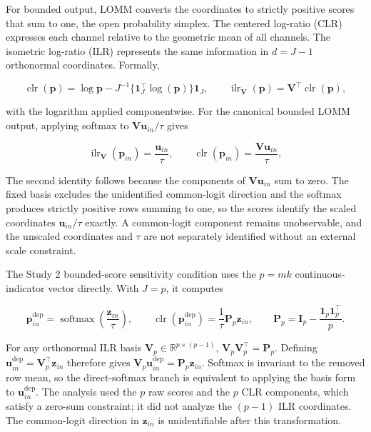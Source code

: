 \documentclass[
]{article}
\begin{document}
For bounded output, LOMM converts the coordinates to strictly positive
scores that sum to one, the open probability simplex. The centered
log-ratio (CLR) expresses each channel relative to the geometric mean of
all channels. The isometric log-ratio (ILR) represents the same
information in \(d=J-1\) orthonormal coordinates. Formally,

\[
\operatorname{clr}(\mathbf p)
=\log\mathbf p-
J^{-1}\{\mathbf 1_J^\top\log(\mathbf p)\}\mathbf 1_J,
\qquad
\operatorname{ilr}_{\mathbf V}(\mathbf p)
=\mathbf V^\top\operatorname{clr}(\mathbf p),
\]

with the logarithm applied componentwise. For the canonical bounded LOMM
output, applying softmax to \(\mathbf V\mathbf u_{in}/\tau\) gives

\[
\operatorname{ilr}_{\mathbf V}(\mathbf p_{in})=\frac{\mathbf u_{in}}{\tau},
\qquad
\operatorname{clr}(\mathbf p_{in})
=\frac{\mathbf V\mathbf u_{in}}{\tau},
\]

The second identity follows because the components of
\(\mathbf V\mathbf u_{in}\) sum to zero. The fixed basis excludes the
unidentified common-logit direction and the softmax produces strictly
positive rows summing to one, so the scores identify the scaled
coordinates \(\mathbf u_{in}/\tau\) exactly. A common-logit component
remains unobservable, and the unscaled coordinates and \(\tau\) are not
separately identified without an external scale constraint.

The Study 2 bounded-score sensitivity condition uses the \(p=mk\)
continuous-indicator vector directly. With \(J=p\), it computes

\[
\mathbf p^{\mathrm{dep}}_{in}
=\operatorname{softmax}\left(\frac{\mathbf z_{in}}{\tau}\right),
\qquad
\operatorname{clr}\!\left(\mathbf p^{\mathrm{dep}}_{in}\right)
=\frac{1}{\tau}\mathbf P_p\mathbf z_{in},
\qquad
\mathbf P_p
=\mathbf I_p-\frac{\mathbf 1_p\mathbf 1_p^\top}{p}.
\]

For any orthonormal ILR basis
\(\mathbf V_p\in\mathbb R^{p\times(p-1)}\),
\(\mathbf V_p\mathbf V_p^\top=\mathbf P_p\). Defining
\(\mathbf u^{\mathrm{dep}}_{in}=\mathbf V_p^\top\mathbf z_{in}\)
therefore gives
\(\mathbf V_p\mathbf u^{\mathrm{dep}}_{in}=\mathbf P_p\mathbf z_{in}\).
Softmax is invariant to the removed row mean, so the direct-softmax
branch is equivalent to applying the basis form to
\(\mathbf u^{\mathrm{dep}}_{in}\). The analysis used the \(p\) raw
scores and the \(p\) CLR components, which satisfy a zero-sum
constraint; it did not analyze the \((p-1)\) ILR coordinates. The
common-logit direction in \(\mathbf z_{in}\) is unidentifiable after
this transformation.
\end{document}
